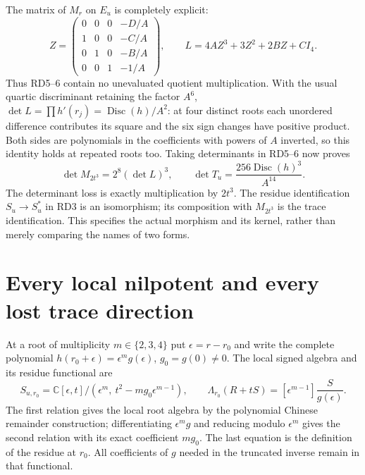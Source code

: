 \documentclass[11pt]{article}
\newcommand{\C}{\mathbb C}
\begin{document}
The matrix of $M_r$ on $E_u$ is completely explicit:
\begin{equation}
 Z=\begin{pmatrix}
 0&0&0&-D/A\\1&0&0&-C/A\\0&1&0&-B/A\\0&0&1&-1/A
 \end{pmatrix},\qquad
 L=4AZ^3+3Z^2+2BZ+CI_4 .
 \tag{RD7}
\end{equation}
Thus RD5--6 contain no unevaluated quotient multiplication.
With the usual quartic discriminant retaining the factor $A^6$,
$\det L=\prod h'(r_j)=\operatorname{Disc}(h)/A^2$:
at four distinct roots each unordered difference contributes
its square and the six sign changes have positive product.
Both sides are polynomials in the coefficients with powers of
$A$ inverted, so this identity holds at repeated roots too.
Taking determinants in RD5--6 now proves
\begin{equation}
 \det M_{2t^3}=2^8(\det L)^3,\qquad
 \det T_u=\frac{256\operatorname{Disc}(h)^3}{A^{14}}.
 \tag{RD8}
\end{equation}
The determinant loss is exactly multiplication by $2t^3$.
The residue identification $S_u\to S_u^*$ in RD3 is an
isomorphism; its composition with $M_{2t^3}$ is the trace
identification. This specifies the actual morphism and its
kernel, rather than merely comparing the names of two forms.

\section{Every local nilpotent and every lost trace direction}
At a root of multiplicity $m\in\{2,3,4\}$ put
$\epsilon=r-r_0$ and write the complete polynomial
$h(r_0+\epsilon)=\epsilon^m g(\epsilon)$, $g_0=g(0)\ne0$.
The local signed algebra and its residue functional are
\begin{equation}
 S_{u,r_0}=\C[\epsilon,t]/
   (\epsilon^m,\ t^2-mg_0\epsilon^{m-1}),\qquad
 \Lambda_{r_0}(R+tS)=[\epsilon^{m-1}]\frac{S}{g(\epsilon)}.
 \tag{RD9}
\end{equation}
The first relation gives the local root algebra by the
polynomial Chinese remainder construction; differentiating
$\epsilon^m g$ and reducing modulo $\epsilon^m$ gives
the second relation with its exact coefficient $mg_0$.
The last equation is the definition of the residue at $r_0$.
All coefficients of $g$ needed in the truncated inverse
remain in that functional.
\end{document}
